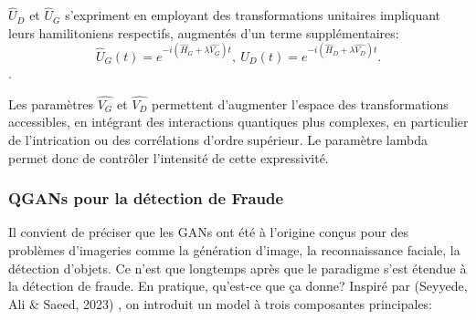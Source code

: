 \documentclass[a4paper]{article}
\begin{document}
$\hat{U}_D$ et $\hat{U}_G$ s'expriment en employant des transformations unitaires impliquant leurs hamilitoniens respectifs, augmentés d'un terme supplémentaires: 
\[
\hat{U}_G(t) = e^{-i(\hat{H}_G +\lambda \hat{V_G})t} ,~
\hat{U}_D(t) = e^{-i(\hat{H}_D+\lambda \hat{V_D})t}.
\].

Les paramètres $\hat{V_G}$ et $\hat{V_D}$ permettent d’augmenter l’espace des transformations accessibles, en intégrant des interactions quantiques plus complexes, en particulier de l’intrication ou des corrélations d’ordre supérieur. Le paramètre lambda permet donc de contrôler l'intensité de cette expressivité. 

\subsubsection{QGANs pour la détection de Fraude}

Il convient de préciser que les GANs ont été à l'origine conçus pour des problèmes d'imageries comme la génération d'image, la reconnaissance faciale, la détection d'objets. Ce n'est que longtemps après que le paradigme s'est étendue à la détection de fraude. En pratique, qu'est-ce que ça donne? Inspiré par (Seyyede, Ali \& Saeed, 2023) \cite{GANs}, on introduit un model à trois composantes principales: 
\end{document}
